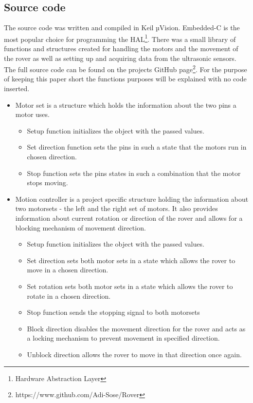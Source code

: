\subsection{Source code}
The source code was written and compiled in Keil µVision. Embedded-C is the most popular choice for programming the HAL\footnote{Hardware Abstraction Layer}. There was a small library of functions and structures created for handling the motors and the movement of the rover as well as setting up and acquiring data from the ultrasonic sensors. The full source code can be found on the projects GitHub page\footnote{https://www.github.com/Adi-Sose/Rover}. For the purpose of keeping this paper short the functions purposes will be explained with no code inserted.
\begin{itemize}
    \item Motor set is a structure which holds the information about the two pins a motor uses.
    \begin{itemize}
        \item Setup function initializes the object with the passed values.
        \item Set direction function sets the pins in such a state that the motors run in chosen direction.
        \item Stop function sets the pins states in such a combination that the motor stops moving.
    \end{itemize}
    \item Motion controller is a project specific structure holding the information about two motorsets - the left and the right set of motors. It also provides information about current rotation or direction of the rover and allows for a blocking mechanism of movement direction.
    \begin{itemize}
        \item Setup function initializes the object with the passed values.
        \item Set direction sets both motor sets in a state which allows the rover to move in a chosen direction.
        \item Set rotation sets both motor sets in a state which allows the rover to rotate in a chosen direction.
        \item Stop function sends the stopping signal to both motorsets
        \item Block direction disables the movement direction for the rover and acts as a locking mechanism to prevent movement in specified direction.
        \item Unblock direction allows the rover to move in that direction once again.

\end{itemize}
\end{itemize}
